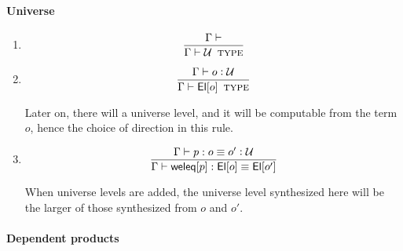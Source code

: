 \documentclass[11pt]{article}
\newcommand{\eqd}{\equiv}
\newcommand{\Eu}{{\cal U}}
\newcommand{\ccheck}[1]{\vcentcolon#1}  %
\newcommand{\synth}[1]{\vcentcolon(\Rightarrow#1)} %
\renewcommand{\synth}[1]{\ccheck#1} %
\newcommand{\Type}{\mathop{\text{ \sc type}}}
\newcommand{\Okay}{\mathop{\text{ \sc okay}}}
\newcommand{\Context}{\vdash\Okay}
\renewcommand{\Context}{\vdash}
\newcommand{\ha}[2]{#1[#2]}
\newcommand{\El}{{\sf El}}
\newcommand{\weleq}{{\sf weleq}}
\begin{document}
\paragraph{Universe}

\begin{enumerate}

\item

$$\frac{\Gamma\Context}{\Gamma \vdash \Eu\Type}$$

\item

$$\frac{\Gamma\vdash o \synth{\Eu}}{\Gamma \vdash \ha\El{o}\Type}$$

Later on, there will a universe level, and it will be computable from the
term $o$, hence the choice of direction in this rule.

\item 

$$\frac{\Gamma\vdash p : o \eqd o' \synth{\Eu}}{\Gamma\vdash \ha\weleq{p} : \ha\El{o} \eqd \ha\El{o'}}$$

When universe levels are added, the universe level synthesized here will be the
larger of those synthesized from $o$ and $o'$.

\end{enumerate}

\paragraph{Dependent products}
\end{document}
